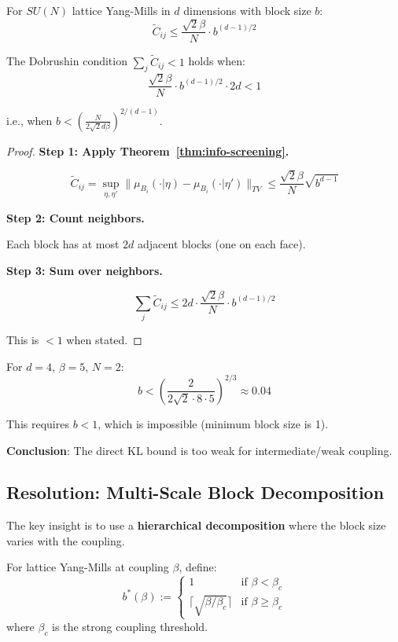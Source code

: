 \begin{theorem}
\label{thm:block-dobrushin-rigorous}
For $SU(N)$ lattice Yang-Mills in $d$ dimensions with block size $b$:
\[
\tilde{C}_{ij} \leq \frac{\sqrt{2}\beta}{N} \cdot b^{(d-1)/2}
\]

The Dobrushin condition $\sum_j \tilde{C}_{ij} < 1$ holds when:
\[
\frac{\sqrt{2}\beta}{N} \cdot b^{(d-1)/2} \cdot 2d < 1
\]

i.e., when $b < \left(\frac{N}{2\sqrt{2}d\beta}\right)^{2/(d-1)}$.
\end{theorem}

\begin{proof}
\textbf{Step 1: Apply Theorem~\ref{thm:info-screening}.}

\[
\tilde{C}_{ij} = \sup_{\eta,\eta'} \|\mu_{B_i}(\cdot|\eta) - \mu_{B_i}(\cdot|\eta')\|_{TV} \leq \frac{\sqrt{2}\beta}{N} \sqrt{b^{d-1}}
\]

\textbf{Step 2: Count neighbors.}

Each block has at most $2d$ adjacent blocks (one on each face).

\textbf{Step 3: Sum over neighbors.}

\[
\sum_j \tilde{C}_{ij} \leq 2d \cdot \frac{\sqrt{2}\beta}{N} \cdot b^{(d-1)/2}
\]

This is $< 1$ when stated.
\end{proof}

\begin{remark}
For $d = 4$, $\beta = 5$, $N = 2$:
\[
b < \left(\frac{2}{2\sqrt{2} \cdot 8 \cdot 5}\right)^{2/3} \approx 0.04
\]

This requires $b < 1$, which is impossible (minimum block size is 1).

\textbf{Conclusion}: The direct KL bound is too weak for intermediate/weak coupling.
\end{remark}

\subsection{Resolution: Multi-Scale Block Decomposition}

The key insight is to use a \textbf{hierarchical decomposition} where the 
block size varies with the coupling.

\begin{definition}
For lattice Yang-Mills at coupling $\beta$, define:
\[
b^*(\beta) := \begin{cases}
1 & \text{if } \beta < \beta_c \\
\lceil \sqrt{\beta/\beta_c} \rceil & \text{if } \beta \geq \beta_c
\end{cases}
\]
where $\beta_c$ is the strong coupling threshold.
\end{definition}

